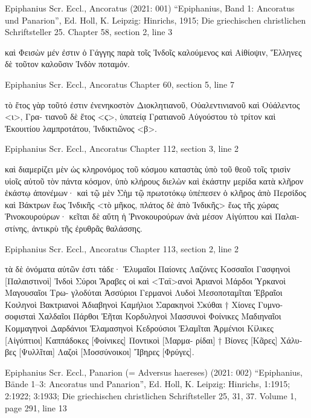 \documentclass[12pt,letterpaper,twoside,final]{memoir}
\begin{document}
\begin{greek}

Epiphanius Scr. Eccl., Ancoratus (2021: 001)
“Epiphanius, Band 1: Ancoratus und Panarion”, Ed. Holl, K.
Leipzig: Hinrichs, 1915; Die griechischen christlichen Schriftsteller 25.
Chapter 58, section 2, line 3

        καὶ Φεισὼν μέν ἐστιν ὁ Γάγγης παρὰ τοῖς Ἰνδοῖς καλούμενος 
καὶ Αἰθίοψιν, Ἕλληνες δὲ τοῦτον καλοῦσιν Ἰνδὸν ποταμόν. 



Epiphanius Scr. Eccl., Ancoratus 
Chapter 60, section 5, line 7

                                          τὸ ἔτος γὰρ τοῦτό ἐστιν   
ἐνενηκοστὸν Διοκλητιανοῦ, Οὐαλεντινιανοῦ καὶ Οὐάλεντος <ι>, Γρα-
τιανοῦ δὲ ἔτος <ϛ>, ὑπατείᾳ Γρατιανοῦ Αὐγούστου τὸ τρίτον καὶ 
Ἐκουιτίου λαμπροτάτου, Ἰνδικτιῶνος <β>. 



Epiphanius Scr. Eccl., Ancoratus 
Chapter 112, section 3, line 2

                                καὶ διαμερίζει μὲν ὡς κληρονόμος τοῦ 
κόσμου καταστὰς ὑπὸ τοῦ θεοῦ τοῖς τρισὶν υἱοῖς αὐτοῦ τὸν πάντα 
κόσμον, ὑπὸ κλήρους διελὼν καὶ ἑκάστην μερίδα κατὰ κλῆρον ἑκάστῳ 
ἀπονέμων· καὶ τῷ μὲν Σὴμ τῷ πρωτοτόκῳ ὑπέπεσεν ὁ κλῆρος ἀπὸ   
Περσίδος καὶ Βάκτρων ἕως Ἰνδικῆς <τὸ μῆκος, πλάτος δὲ ἀπὸ Ἰνδικῆς> 
ἕως τῆς χώρας Ῥινοκουρούρων· κεῖται δὲ αὕτη ἡ Ῥινοκουρούρων 
ἀνὰ μέσον Αἰγύπτου καὶ Παλαιστίνης, ἀντικρὺ τῆς ἐρυθρᾶς θαλάσσης. 



Epiphanius Scr. Eccl., Ancoratus 
Chapter 113, section 2, line 2

                          τὰ δὲ ὀνόματα αὐτῶν ἐστι τάδε· Ἐλυμαῖοι 
Παίονες Λαζόνες Κοσσαῖοι Γασφηνοὶ [Παλαιστινοὶ] Ἰνδοὶ Σύροι 
Ἄραβες οἱ καὶ <Ταϊ>ανοὶ Ἀριανοὶ Μάρδοι Ὑρκανοὶ Μαγουσαῖοι Τρω-
γλοδύται Ἀσσύριοι Γερμανοὶ Λυδοὶ Μεσοποταμῖται Ἑβραῖοι Κοιληνοὶ 
Βακτριανοὶ Ἀδιαβηνοὶ Καμήλιοι Σαρακηνοὶ Σκύθαι † Χίονες Γυμνο-  
σοφισταὶ Χαλδαῖοι Πάρθοι Ἐῆται Κορδυληνοὶ Μασσυνοὶ Φοίνικες 
Μαδιηναῖοι Κομμαγηνοὶ Δαρδάνιοι Ἐλαμασηνοὶ Κεδρούσιοι Ἐλαμῖται 
Ἀρμένιοι Κίλικες [Αἰγύπτιοι] Καππάδοκες [Φοίνικες] Ποντικοὶ [Μαρμα-
ρίδαι] † Βίονες [Κᾶρες] Χάλυβες [Ψυλλῖται] Λαζοὶ [Μοσσύνοικοι] 
Ἴβηρες [Φρύγες]. 



Epiphanius Scr. Eccl., Panarion (= Adversus haereses) (2021: 002)
“Epiphanius, Bände 1–3: Ancoratus und Panarion”, Ed. Holl, K.
Leipzig: Hinrichs, 1:1915; 2:1922; 3:1933; Die griechischen christlichen Schriftsteller 25, 31, 37.
Volume 1, page 291, line 13


\end{greek}
\end{document}
